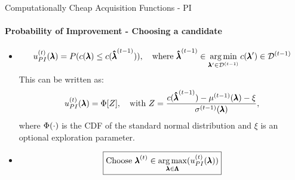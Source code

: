 \begin{frame}[c]{Computationally Cheap Acquisition Functions - PI}
\framesubtitle{Probability of Improvement - Choosing a candidate}
\begin{itemize}
    \item[]
        \[
            \iter{\acq}_{PI}(\conf) = P(\cost(\conf) \leq \cost(\incumbent[\bocount-1])), \quad \text{where } \incumbent[\bocount-1]\in\argmin_{\conf'\in\iter[\bocount-1]{\dataset}}\obs[\conf']\in\iter[\bocount-1]{\dataset}
        \]
    \pause
    \bigskip
    \bigskip
    This can be written as:
    \vspace*{-1.0cm}
    \[
        \iter{\acq}_{PI}(\conf) = \cdf[Z], \quad \text{with } Z = \dfrac{\cost(\incumbent[\bocount-1]) - \iter[\bocount-1]{\mean}(\conf) - \xi}{\iter[\bocount-1]{\stddev}(\conf)}, 
    \]
    \newline
    where $\cdf(\cdot)$ is the CDF of the standard normal distribution and $\xi$ is an optional exploration parameter.
    \pause
    \item[] \[\boxed{\text{Choose } \bonextsample \in \argmax_{\conf\in\pcs}(\iter{\acq}_{PI}(\conf))}\]
\end{itemize}
\end{frame}
